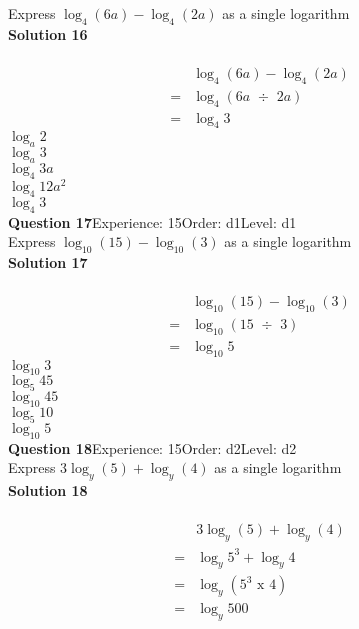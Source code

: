 \documentclass{article}
\begin{document}
Express $\log_{4}(6a)-\log_{4}(2a)$ as a single logarithm\\[4pt]
\noindent\textbf{Solution 16}\\[2pt]
\\[-10pt]\begin{align*}
&\log_{4}(6a)-\log_{4}(2a)\\[2pt]
=&\log_{4}(6a \,\, \div \,\, 2a)\\[2pt]
=&\log_{4}3
\end{align*}
$\log_{a}2$\\
$\log_{a}3$\\
$\log_{4}3a$\\
$\log_{4}12a^2$\\
$\log_{4}3$\\
\noindent\textbf{Question 17}\hspace{20pt}Experience: 15\hspace{20pt}Order: d1\hspace{20pt}Level: d1\\[2pt]
Express $\log_{10}(15)-\log_{10}(3)$ as a single logarithm\\[4pt]
\noindent\textbf{Solution 17}\\[2pt]
\\[-10pt]\begin{align*}
&\log_{10}(15)-\log_{10}(3)\\[2pt]
=&\log_{10}(15 \,\, \div \,\, 3)\\[2pt]
=&\log_{10}5
\end{align*}
$\log_{10}3$\\
$\log_{5}45$\\
$\log_{10}45$\\
$\log_{5}10$\\
$\log_{10}5$\\
\noindent\textbf{Question 18}\hspace{20pt}Experience: 15\hspace{20pt}Order: d2\hspace{20pt}Level: d2\\[2pt]
Express $3\log_{y}(5)+\log_{y}(4)$ as a single logarithm\\[4pt]
\noindent\textbf{Solution 18}\\[2pt]
\\[-10pt]\begin{align*}
&3\log_{y}(5)+\log_{y}(4)\\[2pt]
=&\log_{y}5^3+\log_{y}4\\[2pt]
=&\log_{y}(5^3 \,\, \text{x} \,\, 4)\\[2pt]
=&\log_{y}500
\end{align*}
\end{document}
